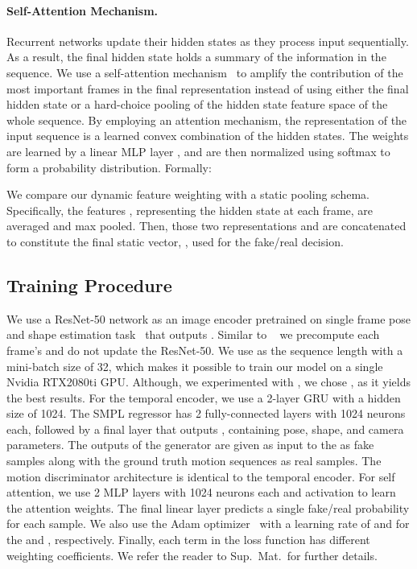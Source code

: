 \documentclass[10pt,twocolumn,letterpaper]{article}
\begin{document}
\paragraph{Self-Attention Mechanism.}
\label{sec:attention}
Recurrent networks update their hidden states as they process input sequentially. As a result, the final hidden state holds a summary of the information in the sequence. We use a self-attention mechanism~\cite{DBLP:journals/corr/BahdanauCB14,baziotis2018ntua} to amplify the contribution of the most important frames in the final representation instead of using either the final hidden state  or a hard-choice pooling of the hidden state feature space of the whole sequence. By employing an attention mechanism, the representation  of the input sequence  is a learned convex combination
of the hidden states. The weights  are learned by a linear MLP layer , and are then normalized using softmax to form a probability distribution. Formally: 

We compare our dynamic feature weighting with a static pooling schema. 
Specifically, the features , representing the hidden state at each frame, are averaged and max pooled. Then, those two representations  and  are concatenated to constitute the final static vector, , used for the  fake/real  decision.

\subsection{Training Procedure}
We use a ResNet-50 network \cite{he2016resnet} as an image encoder pretrained on single frame pose and shape estimation task~\cite{kanazawa_hmr,SPIN:ICCV:2019} that outputs . Similar to ~\cite{kanazawa_temporal_hmr} we precompute each frame's  and do not update the ResNet-50. We use  as the sequence length with a mini-batch size of 32, which makes it possible to train our model on a single Nvidia RTX2080ti GPU. 
Although, we experimented with , we chose , as it yields the best results. 
For the temporal encoder, we use a 2-layer GRU with a hidden size of 1024. The SMPL regressor has 2 fully-connected layers with 1024 neurons each, followed by a final layer that outputs , containing pose, shape, and camera parameters. The outputs of the generator are given as input to the  as fake samples along with the ground truth motion sequences as real samples.  The motion discriminator architecture is identical to the temporal encoder. For self attention, we use 2 MLP layers with 1024 neurons each and  activation to learn the attention weights. The final linear layer predicts a single fake/real probability for each sample. We also use the Adam optimizer~\cite{Adam} with a learning rate of  and  for the  and , respectively. Finally, each term in the loss function has different weighting coefficients. We refer the reader to Sup.~Mat.~for further details.
 		
\end{document}
